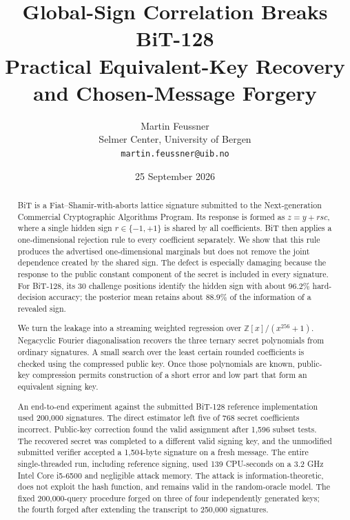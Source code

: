 \documentclass[11pt,a4paper]{article}
\title{\bfseries Global-Sign Correlation Breaks BiT-128\\
\large Practical Equivalent-Key Recovery and Chosen-Message Forgery}
\author{Martin Feussner\\
\small Selmer Center, University of Bergen\\
\small \texttt{martin.feussner@uib.no}}
\date{25 September 2026}
\newcommand{\Z}{\mathbb{Z}}
\begin{document}
\maketitle

\begin{center}
\end{center}
\vspace{0.7em}

\begin{abstract}
BiT is a Fiat--Shamir-with-aborts lattice signature submitted to the
Next-generation Commercial Cryptographic Algorithms Program.  Its response is
formed as $z=y+rsc$, where a single hidden sign $r\in\{-1,+1\}$ is shared by
all coefficients.  BiT then applies a one-dimensional rejection rule to every
coefficient separately.  We show that this rule produces the advertised
one-dimensional marginals but does not remove the joint dependence created by
the shared sign.  The defect is especially damaging because the response to
the public constant component of the secret is included in every signature.
For BiT-128, its 30 challenge positions identify the hidden sign with about
$96.2\%$ hard-decision accuracy; the posterior mean retains about $88.9\%$ of
the information of a revealed sign.

We turn the leakage into a streaming weighted regression over
$\Z[x]/(x^{256}+1)$.  Negacyclic Fourier diagonalisation recovers the three
ternary secret polynomials from ordinary signatures.  A small search over the
least certain rounded coefficients is checked using the compressed public key.
Once those polynomials are known, public-key compression permits construction
of a short error and low part that form an equivalent signing key.

An end-to-end experiment against the submitted BiT-128 reference
implementation used 200,000 signatures.  The direct estimator left five of 768
secret coefficients incorrect.  Public-key correction found the valid
assignment after 1,596 subset tests.  The recovered secret was completed to a
different valid signing key, and the unmodified submitted verifier accepted a
1,504-byte signature on a fresh message.  The entire single-threaded run,
including reference signing, used 139 CPU-seconds on a 3.2 GHz Intel Core
i5-6500 and negligible attack memory.  The attack is information-theoretic,
does not exploit the hash function, and remains valid in the random-oracle
model.  The fixed 200,000-query procedure forged on three of four independently
generated keys; the fourth forged after extending the transcript to 250,000
signatures.
\end{abstract}
\end{document}
